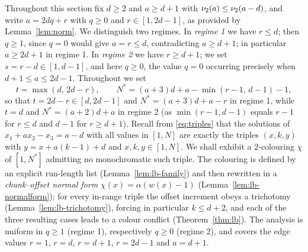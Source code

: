 
Throughout this section fix $d \ge 2$ and $a \ge d+1$ with $\nu_2(a) \le \nu_2(a-d)$,
and write $a = 2dq + r$ with $q \ge 0$ and $r \in [1, 2d-1]$, as provided by
Lemma~\ref{lem:norm}. We distinguish two regimes. In \emph{regime 1} we have
$r \le d$; then $q \ge 1$, since $q = 0$ would give $a = r \le d$, contradicting
$a \ge d+1$; in particular $a \ge 2d+1$ in regime 1. In \emph{regime 2} we have
$r \ge d+1$; we set $s = r - d \in [1, d-1]$, and here $q \ge 0$, the value $q = 0$
occurring precisely when $d+1 \le a \le 2d-1$. Throughout we set
\[
  t = \max(d,\, 2d-r), \qquad N^{*} = (a+3)d + a - \min(r-1,\, d-1) - 1,
\]
so that $t = 2d-r \in [d, 2d-1]$ and $N^{*} = (a+3)d + a - r$ in regime 1, while
$t = d$ and $N^{*} = (a+2)d + a$ in regime 2 (as $\min(r-1, d-1)$ equals $r-1$ for
$r \le d$ and $d-1$ for $r \ge d+1$). Recall from \eqref{eq:triples} that the
solutions of $x_1 + a x_2 - x_3 = a - d$ with all values in $[1, N]$ are exactly
the triples $(x, k, y)$ with $y = x + a(k-1) + d$ and $x, k, y \in [1, N]$. We
shall exhibit a $2$-colouring $\chi$ of $[1, N^{*}]$ admitting no monochromatic
such triple. The colouring is defined by an explicit run-length list
(Lemma~\ref{lem:lb-family}) and then rewritten in a \emph{chunk--offset normal
form} $\chi(x) = \alpha(w(x)-1)$ (Lemma~\ref{lem:lb-normalform}); for every
in-range triple the offset increment obeys a trichotomy
(Lemma~\ref{lem:lb-trichotomy}), forcing in particular $k \le d+2$, and each of
the three resulting cases leads to a colour conflict (Theorem~\ref{thm:lb}). The
analysis is uniform in $q \ge 1$ (regime 1), respectively $q \ge 0$ (regime 2),
and covers the edge values $r = 1$, $r = d$, $r = d+1$, $r = 2d-1$ and $a = d+1$.

